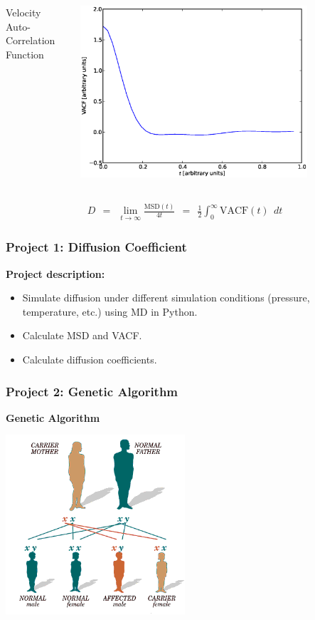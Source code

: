 \documentclass{beamer}
\begin{document}
{\begin{columns}[c]
        Velocity Auto-Correlation Function

        \includegraphics[width=0.8\textwidth]{images/diffusion_vacf.eps}

    \end{columns}

    \begin{align*}
        D \ \ = \ \ \lim_{t\rightarrow \infty} \frac{\mathrm{MSD}(t)}{4t}
          \ \ = \ \ \frac{1}{2} \int_0^\infty \mathrm{VACF}(t) \ \ dt
    \end{align*}

}


\frame
{
  \frametitle{Project 1: Diffusion Coefficient}
  {\bf Project description:}

  \smallskip

  \begin{itemize}
    \item Simulate diffusion under different simulation conditions
            (pressure, temperature, etc.) using MD in Python.
    \vspace{0.2in}
    \item Calculate MSD and VACF.
    \vspace{0.2in}
    \item Calculate diffusion coefficients.
  \end{itemize}

}


\frame
{
    \frametitle{Project 2: Genetic Algorithm}

    \centering
    {\bf Genetic Algorithm}

    \begin{center}
        \includegraphics[width=0.5\textwidth]{images/genetics_family.png}
    \end{center}
}
\end{document}
